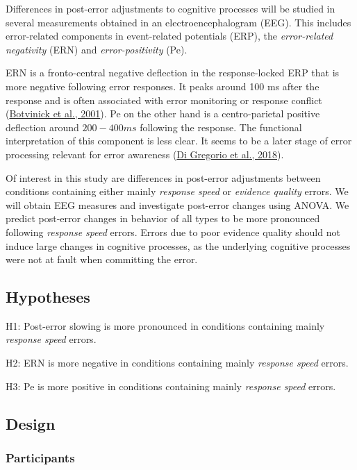 \documentclass[
  man,floatsintext]{apa7}
\begin{document}
Differences in post-error adjustments to cognitive processes will be studied in several measurements obtained in an electroencephalogram (EEG). This includes error-related components in event-related potentials (ERP), the \emph{error-related negativity} (ERN) and \emph{error-positivity} (Pe).

ERN is a fronto-central negative deflection in the response-locked ERP that is more negative following error responses. It peaks around 100 ms after the response and is often associated with error monitoring or response conflict (\protect\hyperlink{ref-botvinick2001conflict}{Botvinick et al., 2001}).
Pe on the other hand is a centro-parietal positive deflection around \(200 - 400 ms\) following the response. The functional interpretation of this component is less clear. It seems to be a later stage of error processing relevant for error awareness (\protect\hyperlink{ref-di2018errors}{Di Gregorio et al., 2018}).

Of interest in this study are differences in post-error adjustments between conditions containing either mainly \emph{response speed} or \emph{evidence quality} errors. We will obtain EEG measures and investigate post-error changes using ANOVA. We predict post-error changes in behavior of all types to be more pronounced following \emph{response speed} errors. Errors due to poor evidence quality should not induce large changes in cognitive processes, as the underlying cognitive processes were not at fault when committing the error.

\hypertarget{hypotheses}{%
\subsection{Hypotheses}\label{hypotheses}}

H1: Post-error slowing is more pronounced in conditions containing mainly \emph{response speed} errors.

H2: ERN is more negative in conditions containing mainly \emph{response speed} errors.

H3: Pe is more positive in conditions containing mainly \emph{response speed} errors.

\hypertarget{design}{%
\subsection{Design}\label{design}}

\hypertarget{participants}{%
\subsubsection{Participants}\label{participants}}
\end{document}
